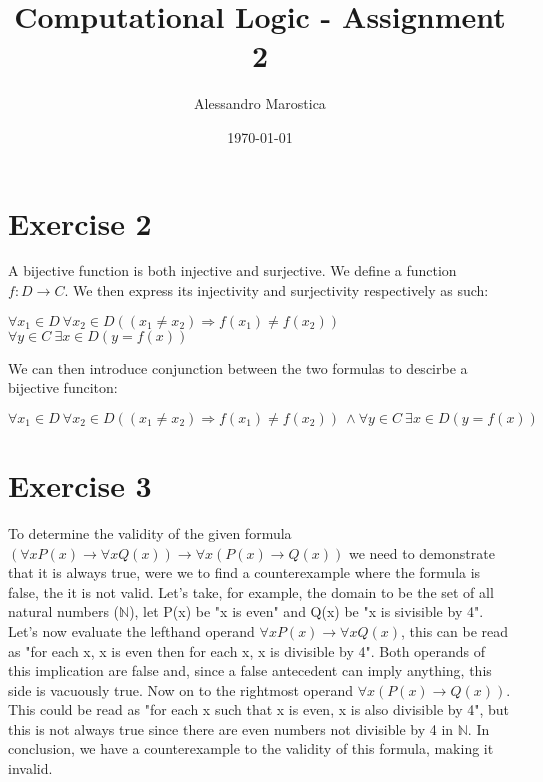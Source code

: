 \documentclass[11pt]{exam}
\title{Computational Logic - Assignment 2}
\author{Alessandro Marostica}
\date{\today}
\begin{document}
\maketitle
\section*{Exercise 2}
A bijective function is both injective and surjective.
We define a function \(f: D \to C\). We then express its injectivity and surjectivity respectively as such:
\begin{center}
    \(\forall x_1 \in D \  \forall x_2 \in D((x_1 \neq x_2) \Longrightarrow f(x_1) \neq f(x_2)) \)
    \\
    \(\forall y \in C \  \exists x \in D(y = f(x))\)
\end{center}
We can then introduce conjunction between the two formulas to descirbe a bijective funciton:
\begin{center}
    \(\forall x_1 \in D \  \forall x_2 \in D((x_1 \neq x_2) \Longrightarrow f(x_1) \neq f(x_2))\ \wedge \forall y \in C \  \exists x \in D(y = f(x))\)
\end{center}
\section*{Exercise 3}
To determine the validity of the given formula \((\forall xP(x) \to \forall xQ(x)) \to \forall x(P(x) \to Q(x))\)
we need to demonstrate that it is always true, were we to find a counterexample where the formula is false, the it is not valid.
Let's take, for example, the domain to be the set of all natural numbers (\(\mathbb{N}\)), let P(x) be "x is even" and Q(x) be "x is sivisible by 4".
Let's now evaluate the lefthand operand \(\forall xP(x) \to \forall xQ(x)\), this can be read as "for each x, x is even then for each x, x is divisible by 4".
Both operands of this implication are false and, since a false antecedent can imply anything, this side is vacuously true.
Now on to the rightmost operand \(\forall x(P(x) \to Q(x))\). This could be read as "for each x such that x is even, x is also divisible by 4", but this is not
always true since there are even numbers not divisible by 4 in \(\mathbb{N}\).
In conclusion, we have a counterexample to the validity of this formula, making it invalid.
\end{document}
